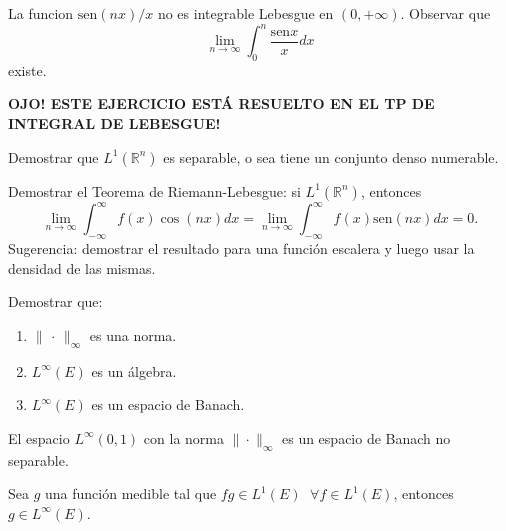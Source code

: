 \documentclass{book}
\newcommand{\rr}{\mathbb{R}}
\begin{document}
 \begin{ejer}{}
La funcion $\text{sen} (nx)/x$ no es integrable Lebesgue en $(0, +\infty)$. Observar que  \[\lim_{n\to\infty} \int_0 ^n\frac{\text{sen} x}{x} dx \]
 existe.
 
 \textbf{OJO! ESTE  EJERCICIO ESTÁ RESUELTO EN EL TP DE INTEGRAL DE LEBESGUE!}
 
 
\end{ejer} 



\begin{ejer}{}
 Demostrar que $L^1(\rr^n)$ es separable, o sea tiene un conjunto denso numerable.
\end{ejer}

\begin{ejer}{}
 Demostrar el Teorema de Riemann-Lebesgue: si  $L^1(\rr^n)$, entonces
 $$\lim_{n\to\infty}\int_{-\infty}^{\infty} f(x) \cos (nx) dx = \lim_{n\to\infty}\int_{-\infty}^{\infty} f(x) \text{sen} (nx) dx=0.$$
Sugerencia: demostrar el resultado para una función escalera y luego usar la densidad de las mismas. 
\end{ejer}




\begin{ejer}{} Demostrar que:
	\begin{enumerate}
\item $\|\, \cdot\,\|_{\infty}$ es una norma.
\item $L^{\infty}(E)$ es un álgebra.
\item $L^{\infty}(E)$ es un espacio de Banach.  
	\end{enumerate}
	\end{ejer}


\begin{ejer}{} El espacio $L^\infty(0, 1)$ con la norma $\|\cdot \|_\infty$ es un espacio de Banach no separable.
\end{ejer}




\begin{ejer}{} Sea $g$ una función medible tal que $fg\in L^1(E)$ $\;\forall f \in L^1(E)$, entonces $g \in L^{\infty}(E)$.
\end{ejer}
\end{document}
